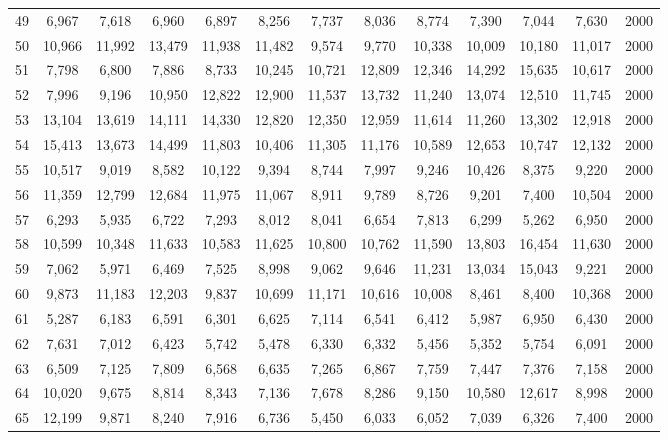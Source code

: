{\begin{longtable}{ >{\footnotesize}ccccccccccccc}
49  & 6,967  & 7,618  & 6,960  & 6,897  & 8,256  & 7,737  & 8,036  & 8,774  & 7,390  & 7,044  & 7,630  & 2000 \\
50  & 10,966 & 11,992 & 13,479 & 11,938 & 11,482 & 9,574  & 9,770  & 10,338 & 10,009 & 10,180 & 11,017 & 2000 \\
51  & 7,798  & 6,800  & 7,886  & 8,733  & 10,245 & 10,721 & 12,809 & 12,346 & 14,292 & 15,635 & 10,617 & 2000 \\
52  & 7,996  & 9,196  & 10,950 & 12,822 & 12,900 & 11,537 & 13,732 & 11,240 & 13,074 & 12,510 & 11,745 & 2000 \\
53  & 13,104 & 13,619 & 14,111 & 14,330 & 12,820 & 12,350 & 12,959 & 11,614 & 11,260 & 13,302 & 12,918 & 2000 \\
54  & 15,413 & 13,673 & 14,499 & 11,803 & 10,406 & 11,305 & 11,176 & 10,589 & 12,653 & 10,747 & 12,132 & 2000 \\
55  & 10,517 & 9,019  & 8,582  & 10,122 & 9,394  & 8,744  & 7,997  & 9,246  & 10,426 & 8,375  & 9,220  & 2000 \\
56  & 11,359 & 12,799 & 12,684 & 11,975 & 11,067 & 8,911  & 9,789  & 8,726  & 9,201  & 7,400  & 10,504 & 2000 \\
57  & 6,293  & 5,935  & 6,722  & 7,293  & 8,012  & 8,041  & 6,654  & 7,813  & 6,299  & 5,262  & 6,950  & 2000 \\
58  & 10,599 & 10,348 & 11,633 & 10,583 & 11,625 & 10,800 & 10,762 & 11,590 & 13,803 & 16,454 & 11,630 & 2000 \\
59  & 7,062  & 5,971  & 6,469  & 7,525  & 8,998  & 9,062  & 9,646  & 11,231 & 13,034 & 15,043 & 9,221  & 2000 \\
60  & 9,873  & 11,183 & 12,203 & 9,837  & 10,699 & 11,171 & 10,616 & 10,008 & 8,461  & 8,400  & 10,368 & 2000 \\
61  & 5,287  & 6,183  & 6,591  & 6,301  & 6,625  & 7,114  & 6,541  & 6,412  & 5,987  & 6,950  & 6,430  & 2000 \\
62  & 7,631  & 7,012  & 6,423  & 5,742  & 5,478  & 6,330  & 6,332  & 5,456  & 5,352  & 5,754  & 6,091  & 2000 \\
63  & 6,509  & 7,125  & 7,809  & 6,568  & 6,635  & 7,265  & 6,867  & 7,759  & 7,447  & 7,376  & 7,158  & 2000 \\
64  & 10,020 & 9,675  & 8,814  & 8,343  & 7,136  & 7,678  & 8,286  & 9,150  & 10,580 & 12,617 & 8,998  & 2000 \\
65  & 12,199 & 9,871  & 8,240  & 7,916  & 6,736  & 5,450  & 6,033  & 6,052  & 7,039  & 6,326  & 7,400  & 2000 \\

\end{longtable}}
